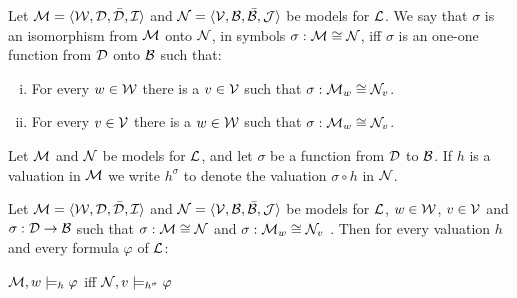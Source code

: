 \begin{defn}
Let $\M = \strucAS$ and $\N = \strucBS$ be models for $\Li$. We say that $\sigma$ is an isomorphism from $\M$ onto $\N$, in symbols $\sigma: \M \iso \N$, iff $\sigma$ is an one-one function from $\D$ onto $\B$ such that:
\begin{enumerate}[(i)]
\item For every $w \in \W$ there is a $v \in \V$ such that $\sigma: \M_{w} \iso \N_{v}$.
\item For every $v \in \V$ there is a $w \in \W$ such that $\sigma: \M_{w} \iso \N_{v}$.
\end{enumerate}
\end{defn}

\qquad Let $\M$ and $\N$ be models for $\Li$, and let $\sigma$ be a function from $\D$ to $\B$. If $h$ is a valuation in $\M$ we write $h^{\sigma}$ to denote the valuation $\sigma \circ h$ in $\N$.

\begin{lema}
Let $\M = \strucAS$ and $\N = \strucBS$ be models for $\Li$, $w \in \W$, $v \in \V$ and $\sigma: \D \impli \B$ such that $\sigma: \M \iso \N$ and $\sigma: \M_{w} \iso \N_{v}$ . Then for every valuation $h$ and every formula $\varphi$ of $\Li$:

\begin{center}
$\M,w \vSs \varphi$ iff $\N,v \models_{h^{\sigma}} \varphi$ 
\end{center}
  
\end{lema}



